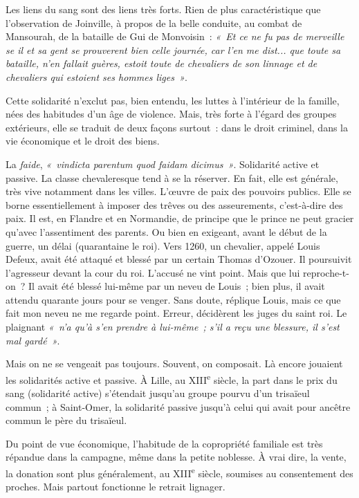 \documentclass[french,twoside]{book} %
\begin{document}
\noindent Les liens du sang sont des liens très forts. Rien de plus caractéristique que l’observation de Joinville, à propos de la belle conduite, au combat de Mansourah, de la bataille de Gui de Monvoisin : \emph{« Et ce ne fu pas de merveille se il et sa gent se prouverent bien celle journée, car l’en me dist... que toute sa bataille, n’en fallait guères, estoit toute de chevaliers de son linnage et de chevaliers qui estoient ses hommes liges »}.\par
Cette solidarité n’exclut pas, bien entendu, les luttes à l’intérieur de la famille, nées des habitudes d’un âge de violence. Mais, très forte à l’égard des groupes extérieurs, elle se traduit de deux façons surtout : dans le droit criminel, dans la vie économique et le droit des biens.\par
La \emph{faide}, \emph{« vindicta parentum quod faidam dicimus »}. Solidarité active et passive. La classe chevaleresque tend à se la réserver. En fait, elle est générale, très vive notamment dans les villes. L’œuvre de paix des pouvoirs publics. Elle se borne essen­tiellement à imposer des trêves ou des asseurements, c’est-à-dire des paix. Il est, en Flandre et en Normandie, de principe que le prince ne peut gracier qu’avec l’assentiment des parents. Ou bien en exigeant, avant le début de la guerre, un délai (quarantaine le roi). Vers 1260, un chevalier, appelé Louis Defeux, avait été attaqué et blessé par un certain Thomas d’Ozouer. Il poursuivit l’agresseur devant la cour du roi. L’accusé ne vint point. Mais que lui reproche­-t-on ? Il avait été blessé lui-même par un neveu de Louis ; bien plus, il avait attendu quarante jours pour se venger. Sans doute, réplique Louis, mais ce que fait mon neveu ne me regarde point. Erreur, décidèrent les juges du saint roi. Le plaignant \emph{« n’a qu’à s’en prendre à lui-même ; s’il a reçu une blessure, il s’est mal gardé »}.\par
Mais on ne se vengeait pas toujours. Souvent, on composait. Là encore jouaient les solidarités active et passive. À Lille, au XIII\textsuperscript{e} siècle, la part dans le prix du sang (solidarité active) s’étendait  
\label{p56} jusqu’au groupe pourvu d’un trisaïeul commun ; à Saint-Omer, la solidarité passive jusqu’à celui qui avait pour ancêtre commun le père du trisaïeul.\par
Du point de vue économique, l’habitude de la copropriété familiale est très répandue dans la campagne, même dans la petite noblesse. À vrai dire, la vente, la donation sont plus généralement, au XIII\textsuperscript{e} siècle, soumises au consentement des proches. Mais partout fonctionne le retrait lignager.\par
\end{document}

